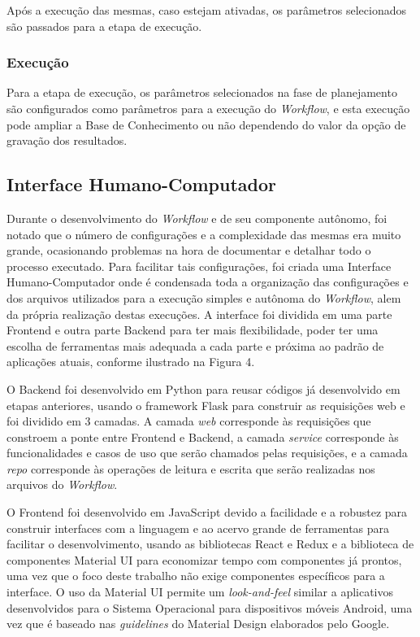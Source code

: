 \documentclass[portugues]{ic-tese}
\begin{document}
Após a execução das mesmas, caso estejam ativadas, os parâmetros selecionados são passados para a etapa de execução.

\subsubsection{Execução}

Para a etapa de execução, os parâmetros selecionados na fase de planejamento são configurados como parâmetros para a execução do \textit{Workflow}, e esta execução pode ampliar a Base de Conhecimento ou não dependendo do valor da opção de gravação dos resultados.

\subsection{Interface Humano-Computador}

Durante o desenvolvimento do \textit{Workflow} e de seu componente autônomo, foi notado que o número de configurações e a complexidade das mesmas era muito grande, ocasionando problemas na hora de documentar e detalhar todo o processo executado. Para facilitar tais configurações, foi criada uma Interface Humano-Computador onde é condensada toda a organização das configurações e dos arquivos utilizados para a execução simples e autônoma do \textit{Workflow}, alem da própria realização destas execuções. A interface foi dividida em uma parte Frontend e outra parte Backend para ter mais flexibilidade, poder ter uma escolha de ferramentas mais adequada a cada parte e próxima ao padrão de aplicações atuais, conforme ilustrado na Figura 4.

O Backend foi desenvolvido em Python para reusar códigos já desenvolvido em etapas anteriores, usando o framework Flask para construir as requisições web e foi dividido em 3 camadas. A camada \textit{web} corresponde às requisições que constroem a ponte entre Frontend e Backend, a camada \textit{service} corresponde às funcionalidades e casos de uso que serão chamados pelas requisições, e a camada \textit{repo} corresponde às operações de leitura e escrita que serão realizadas nos arquivos do \textit{Workflow}.

O Frontend foi desenvolvido em JavaScript devido a facilidade e a robustez para construir interfaces com a linguagem e ao acervo grande de ferramentas para facilitar o desenvolvimento, usando as bibliotecas React e Redux e a biblioteca de componentes Material UI para economizar tempo com componentes já prontos, uma vez que o foco deste trabalho não exige componentes específicos para a interface. O uso da Material UI permite um \textit{look-and-feel} similar a aplicativos desenvolvidos para o Sistema Operacional para dispositivos móveis Android, uma vez que é baseado nas \textit{guidelines} do Material Design elaborados pelo Google.
\end{document}
